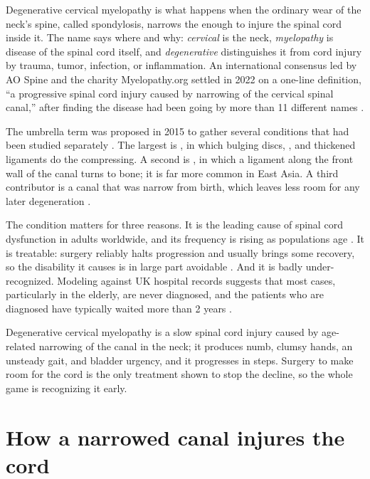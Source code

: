 \documentclass[11pt, letterpaper]{article}
\begin{document}
Degenerative cervical myelopathy is what happens when the ordinary wear of the neck's spine, called \gls{spondylosis}, narrows the  enough to injure the spinal cord inside it. The name says where and why: \emph{cervical} is the neck, \emph{\gls{myelopathy}} is disease of the spinal cord itself, and \emph{degenerative} distinguishes it from cord injury by trauma, tumor, infection, or inflammation. An international consensus led by AO Spine and the charity Myelopathy.org settled in 2022 on a one-line definition, “a progressive spinal cord injury caused by narrowing of the cervical spinal canal,” after finding the disease had been going by more than 11 different names \citep{davies2024def}.

The umbrella term was proposed in 2015 to gather several conditions that had been studied separately \citep{nouri2015}. The largest is , in which bulging discs, , and thickened ligaments do the compressing. A second is , in which a ligament along the front wall of the canal turns to bone; it is far more common in East Asia. A third contributor is a canal that was narrow from birth, which leaves less room for any later degeneration \citep{nouri2015,bajwa2012}.

The condition matters for three reasons. It is the leading cause of spinal cord dysfunction in adults worldwide, and its frequency is rising as populations age \citep{badhiwala2020}. It is treatable: surgery reliably halts progression and usually brings some recovery, so the disability it causes is in large part avoidable \citep{fehlings2017cpg}. And it is badly under-recognized. Modeling against UK hospital records suggests that most cases, particularly in the elderly, are never diagnosed, and the patients who are diagnosed have typically waited more than 2 years \citep{grodzinski2023,behrbalk2013}.

\begin{note}
Degenerative cervical myelopathy is a slow spinal cord injury caused by age-related narrowing of the canal in the neck; it produces numb, clumsy hands, an unsteady gait, and bladder urgency, and it progresses in steps. Surgery to make room for the cord is the only treatment shown to stop the decline, so the whole game is recognizing it early.
\end{note}

\section{How a narrowed canal injures the cord}
\end{document}
